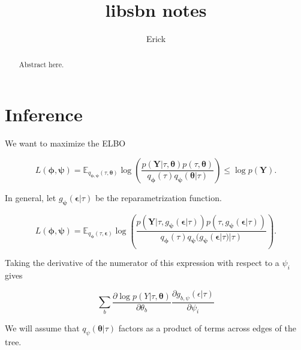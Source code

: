 \documentclass{article}
\title{libsbn notes}
\author{Erick}
\begin{document}
\maketitle

\begin{abstract}
Abstract here.
\end{abstract}


\section*{Inference}

We want to maximize the ELBO

\[
L(\bm{\phi},{\bm{\psi}}) = \mathbb{E}_{q_{\bm{\phi},{\bm{\psi}}}(\tau, \bm{\theta})}\log\left(\frac{p(\bm{Y}|\tau, \bm{\theta}) p(\tau, \bm{\theta})}{q_{\bm{\phi}}(\tau)q_{\bm{\psi}}(\bm{\theta}|\tau)}\right) \leq \log p(\bm{Y}).
\]

In general, let $g_{\bm{\psi}}(\bm{\epsilon}|\tau)$ be the reparametrization function.

\[
L(\bm{\phi},{\bm{\psi}}) = \mathbb{E}_{
    q_{\bm{\phi}}(\tau,\bm{\epsilon})}
    \log\left(\frac{p(\bm{Y}|\tau,g_{\bm{\psi}}(\bm{\epsilon}|\tau))p(\tau, g_{\bm{\psi}}(\bm{\epsilon}|\tau))}{q_{\bm{\phi}}(\tau)q_{\bm{\psi}}(g_{\bm{\psi}}(\bm{\epsilon}|\tau)|\tau)}\right).
\]

Taking the derivative of the numerator of this expression with respect to a $\psi_i$ gives

\[
    \sum_b \frac{\partial \log p(Y | \tau, \bm\theta)}{\partial \theta_b}
    \frac{\partial g_{b,\psi}(\epsilon | \tau)}{\partial \psi_i}
\]


We will assume that $q_\psi(\bm\theta | \tau)$ factors as a product of terms across edges of the tree.






\end{document}
